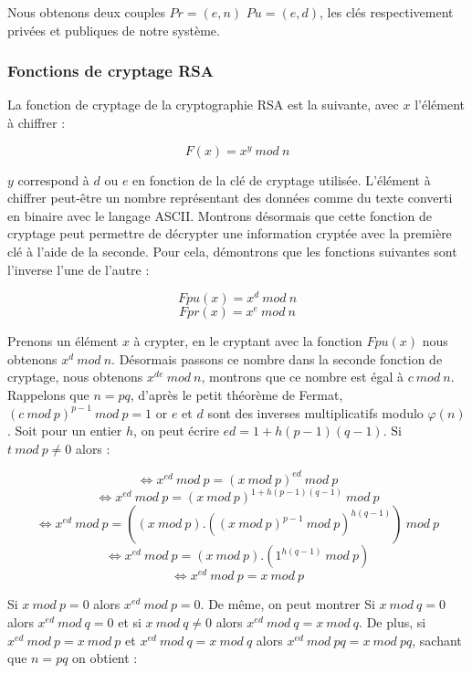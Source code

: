 Nous obtenons deux couples $Pr = (e,n)$ $Pu = (e,d)$, les clés respectivement privées et publiques de notre système.

\subsubsection{Fonctions de cryptage RSA}
La fonction de cryptage de la cryptographie RSA est la suivante, avec $x$ l'élément à chiffrer \cite{cormen_algorithmes_2013} :

\[ F(x) = x^y \: mod \: n\]

$y$ correspond à $d$ ou $e$ en fonction de la clé de cryptage utilisée. L'élément à chiffrer peut-être un nombre représentant des données comme du texte converti en binaire avec le langage ASCII. Montrons désormais que cette fonction de cryptage peut permettre de décrypter une information cryptée avec la première clé à l'aide de la seconde. Pour cela, démontrons que les fonctions suivantes sont l'inverse l'une de l'autre :

\[ Fpu(x) = x^d \: mod \: n\]
\[ Fpr(x) = x^e \: mod \: n\]

Prenons un élément $x$ à crypter, en le cryptant avec la fonction $Fpu(x)$ nous obtenons $x^d \: mod \: n$. Désormais passons ce nombre dans la seconde fonction de cryptage, nous obtenons $x^{de} \: mod \: n$, montrons que ce nombre est égal à $c \: mod \: n$. Rappelons que $n=pq$, d'après le petit théorème de Fermat, $(c \: mod \: p)^{p-1} \: mod \: p = 1$ or $e$ et $d$ sont des inverses multiplicatifs modulo $\varphi(n)$. Soit pour un entier $h$, on peut écrire $ed = 1 + h(p-1)(q-1)$. Si $t \: mod \: p \neq 0$ alors :


\[\Leftrightarrow x^{ed} \: mod \: p = (x \: mod \: p)^{ed} \: mod \: p\]
\[\Leftrightarrow x^{ed} \: mod \: p = (x \: mod \: p)^{1+h(p-1)(q-1)} \: mod \: p\]
\[\Leftrightarrow x^{ed} \: mod \: p = ((x \: mod \: p).((x \: mod \: p)^{p-1} \: mod \: p)^{h(q-1)}) \: mod \: p\]
\[\Leftrightarrow x^{ed} \: mod \: p = (x \: mod \: p).(1^{h(q-1)} \: mod \: p)\]
\[\Leftrightarrow x^{ed} \: mod \: p = x \: mod \: p\]

Si $x \: mod \: p = 0$ alors $x^{ed} \: mod \: p = 0$. De même, on peut montrer Si $x \: mod \: q = 0$ alors $x^{ed} \: mod \: q = 0$ et si $x \: mod \: q \neq 0$ alors $x^{ed} \: mod \: q = x \: mod \: q$. De plus, si $x^{ed} \: mod \: p = x \: mod \: p$ et $x^{ed} \: mod \: q = x \: mod \: q$ alors $x^{ed} \: mod \: pq = x \: mod \: pq$, sachant que $n=pq$ on obtient : 

